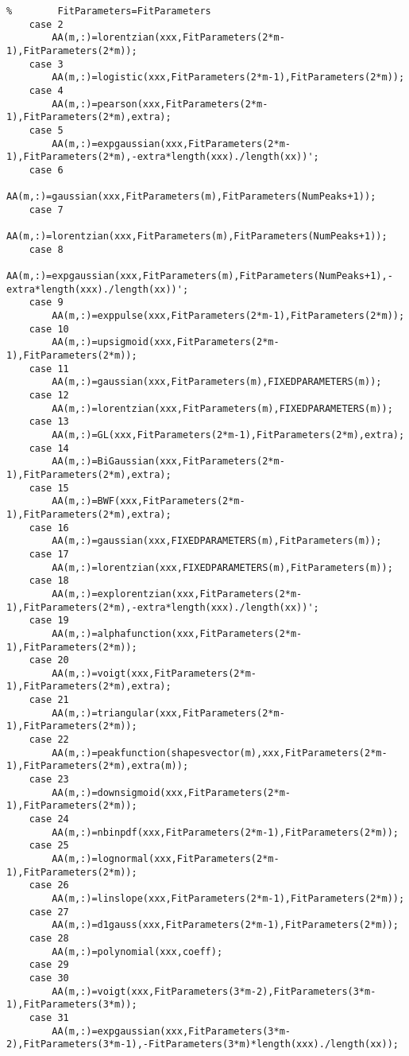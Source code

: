 \begin{lstlisting}
%        FitParameters=FitParameters
    case 2
        AA(m,:)=lorentzian(xxx,FitParameters(2*m-1),FitParameters(2*m));
    case 3
        AA(m,:)=logistic(xxx,FitParameters(2*m-1),FitParameters(2*m));
    case 4
        AA(m,:)=pearson(xxx,FitParameters(2*m-1),FitParameters(2*m),extra);
    case 5
        AA(m,:)=expgaussian(xxx,FitParameters(2*m-1),FitParameters(2*m),-extra*length(xxx)./length(xx))';
    case 6
        AA(m,:)=gaussian(xxx,FitParameters(m),FitParameters(NumPeaks+1));
    case 7
        AA(m,:)=lorentzian(xxx,FitParameters(m),FitParameters(NumPeaks+1));
    case 8
        AA(m,:)=expgaussian(xxx,FitParameters(m),FitParameters(NumPeaks+1),-extra*length(xxx)./length(xx))';
    case 9
        AA(m,:)=exppulse(xxx,FitParameters(2*m-1),FitParameters(2*m));  
    case 10
        AA(m,:)=upsigmoid(xxx,FitParameters(2*m-1),FitParameters(2*m));   
    case 11
        AA(m,:)=gaussian(xxx,FitParameters(m),FIXEDPARAMETERS(m));
    case 12
        AA(m,:)=lorentzian(xxx,FitParameters(m),FIXEDPARAMETERS(m));
    case 13
        AA(m,:)=GL(xxx,FitParameters(2*m-1),FitParameters(2*m),extra);
    case 14
        AA(m,:)=BiGaussian(xxx,FitParameters(2*m-1),FitParameters(2*m),extra);       
    case 15
        AA(m,:)=BWF(xxx,FitParameters(2*m-1),FitParameters(2*m),extra);       
    case 16
        AA(m,:)=gaussian(xxx,FIXEDPARAMETERS(m),FitParameters(m));
    case 17
        AA(m,:)=lorentzian(xxx,FIXEDPARAMETERS(m),FitParameters(m));
    case 18
        AA(m,:)=explorentzian(xxx,FitParameters(2*m-1),FitParameters(2*m),-extra*length(xxx)./length(xx))';
    case 19
        AA(m,:)=alphafunction(xxx,FitParameters(2*m-1),FitParameters(2*m));
    case 20
        AA(m,:)=voigt(xxx,FitParameters(2*m-1),FitParameters(2*m),extra);       
    case 21
        AA(m,:)=triangular(xxx,FitParameters(2*m-1),FitParameters(2*m));
    case 22
        AA(m,:)=peakfunction(shapesvector(m),xxx,FitParameters(2*m-1),FitParameters(2*m),extra(m));        
    case 23
        AA(m,:)=downsigmoid(xxx,FitParameters(2*m-1),FitParameters(2*m));  
    case 24
        AA(m,:)=nbinpdf(xxx,FitParameters(2*m-1),FitParameters(2*m));    
    case 25
        AA(m,:)=lognormal(xxx,FitParameters(2*m-1),FitParameters(2*m));    
    case 26
        AA(m,:)=linslope(xxx,FitParameters(2*m-1),FitParameters(2*m));   
    case 27
        AA(m,:)=d1gauss(xxx,FitParameters(2*m-1),FitParameters(2*m));  
    case 28
        AA(m,:)=polynomial(xxx,coeff);
    case 29
    case 30
        AA(m,:)=voigt(xxx,FitParameters(3*m-2),FitParameters(3*m-1),FitParameters(3*m));        
    case 31
        AA(m,:)=expgaussian(xxx,FitParameters(3*m-2),FitParameters(3*m-1),-FitParameters(3*m)*length(xxx)./length(xx));        

\end{lstlisting}
